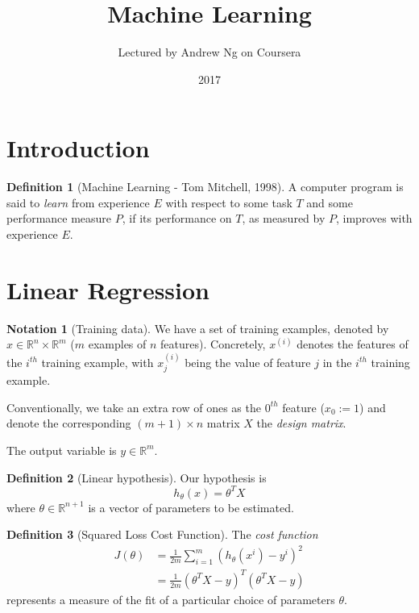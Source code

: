 \documentclass[a4paper,12pt]{article}
\title{Machine Learning}
\author{Lectured by Andrew Ng on Coursera}
\date{2017}
\theoremstyle{definition}
\newtheorem*{defn}{Definition}
\newtheorem*{notn}{Notation}
\newcommand{\R}{\mathbb{R}}
\begin{document}
\maketitle

\section{Introduction}

\begin{defn}[Machine Learning - Tom Mitchell, 1998]
A computer program is said to \emph{learn} from experience $E$ with respect to
some task $T$ and some performance measure $P$, if its performance on $T$,
as measured by $P$, improves with experience $E$.
\end{defn}

\section{Linear Regression}

\begin{notn}[Training data]
We have a set of training examples, denoted by $x \in \R^{n} \times \R^{m}$ ($m$ examples of $n$ features). Concretely, $x^{(i)}$ denotes the features of the $i^{th}$ training example, with $x^{(i)}_{j}$ being the value of feature $j$ in the $i^{th}$ training example. 

Conventionally, we take an extra row of ones as the $0^{th}$ feature ($x_0 := 1$) and denote the corresponding $(m+1) \times n$ matrix $X$ the \emph{design matrix}. 

The output variable is $y \in \R^{m}$.
\end{notn}

\begin{defn}[Linear hypothesis]
Our hypothesis is 
\[
h_{\theta}(x) = \theta^T X
\] where $\theta \in \R^{n+1}$ is a vector of parameters to be estimated.
\end{defn}

\begin{defn}[Squared Loss Cost Function]
The \emph{cost function} 
\begin{align*}
J(\theta) &= \frac{1}{2m} \sum_{i=1}^{m}{ \left( h_{\theta}(x^{i}) - y^{i}\right)^{2} } \\
&= \frac{1}{2m} (\theta^{T} X - y)^{T} (\theta^{T} X - y) 
\end{align*}
represents a measure of the fit of a particular choice of parameters $\theta$.
\end{defn}
\end{document}
